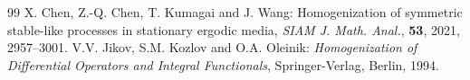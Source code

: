 \documentclass[10pt,a4paper]{amsart}
\begin{document}
\begin{thebibliography}{99}
 X. Chen, Z.-Q. Chen, T. Kumagai and J. Wang: Homogenization of symmetric stable-like processes in stationary ergodic media, \emph{SIAM J. Math. Anal.}, \textbf{53}, 2021, 2957--3001. %
 V.V. Jikov, S.M. Kozlov and O.A. Oleinik: \emph{Homogenization of Differential Operators and Integral Functionals}, Springer-Verlag, Berlin, 1994. %
\end{thebibliography}
\end{document}
